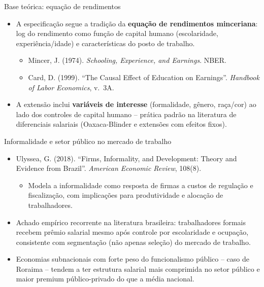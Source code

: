 \documentclass[aspectratio=169]{beamer}
\newcommand{\highlight}[1]{\textcolor{accentblue}{\textbf{#1}}}
\begin{document}
\begin{frame}{Base te\'orica: equa\c{c}\~ao de rendimentos}
  \begin{itemize}
    \item A especifica\c{c}\~ao segue a tradi\c{c}\~ao da \highlight{equa\c{c}\~ao de rendimentos mincer\-iana}: log do rendimento como fun\c{c}\~ao de capital humano (escolaridade, experi\^encia/idade) e caracter\'isticas do posto de trabalho.
    \begin{itemize}
      \item Mincer, J. (1974). \textit{Schooling, Experience, and Earnings}. NBER.
      \item Card, D. (1999). ``The Causal Effect of Education on Earnings''. \textit{Handbook of Labor Economics}, v.\ 3A.
    \end{itemize}
    \item A extens\~ao inclui \highlight{vari\'aveis de interesse} (formalidade, g\^enero, ra\c{c}a/cor) ao lado dos controles de capital humano -- pr\'atica padr\~ao na literatura de diferenciais salariais (Oaxaca-Blinder e extens\~oes com efeitos fixos).
  \end{itemize}
\end{frame}

\begin{frame}{Informalidade e setor p\'ublico no mercado de trabalho}
  \begin{itemize}
    \item Ulyssea, G. (2018). ``Firms, Informality, and Development: Theory and Evidence from Brazil''. \textit{American Economic Review}, 108(8).
    \begin{itemize}
      \item Modela a informalidade como resposta de firmas a custos de regula\c{c}\~ao e fiscaliza\c{c}\~ao, com implica\c{c}\~oes para produtividade e aloca\c{c}\~ao de trabalhadores.
    \end{itemize}
    \item Achado emp\'irico recorrente na literatura brasileira: trabalhadores formais recebem pr\^emio salarial mesmo ap\'os controle por escolaridade e ocupa\c{c}\~ao, consistente com segmenta\c{c}\~ao (n\~ao apenas sele\c{c}\~ao) do mercado de trabalho.
    \item Economias subnacionais com forte peso do funcionalismo p\'ublico -- caso de Roraima -- tendem a ter estrutura salarial mais comprimida no setor p\'ublico e maior premium público-privado do que a m\'edia nacional.
  \end{itemize}
\end{frame}
\end{document}
